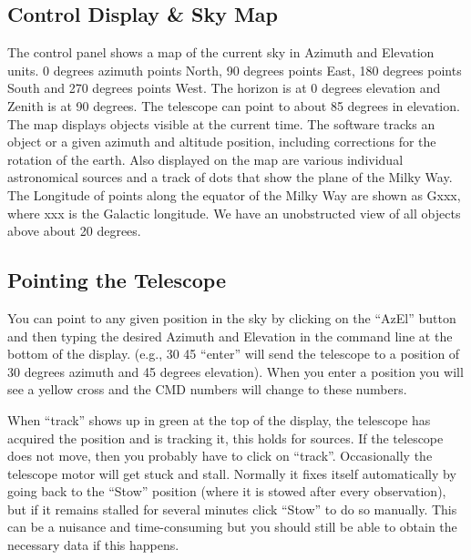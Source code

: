 \subsection{Control Display \& Sky Map}
The control panel shows a map of the current sky in Azimuth and
Elevation units. 0 degrees azimuth points North, 90 degrees points East, 180
degrees points South and 270 degrees points West. The horizon is at 0 degrees
elevation and Zenith is at 90 degrees. The telescope can point to about 85
degrees in elevation.
The map displays objects visible at the current time. The software tracks
an object or a given azimuth and altitude position, including corrections for the
rotation of the earth. Also displayed on the map are various individual
astronomical sources and a track of dots that show the plane of the Milky Way.
The Longitude of points along the equator of the Milky Way are shown as Gxxx,
where xxx is the Galactic longitude. We have an unobstructed view of all objects
above about 20 degrees.

\subsection{Pointing the Telescope}
You can point to any given position in the sky by clicking on the “AzEl”
button and then typing the desired Azimuth and Elevation in the command line at
the bottom of the display. (e.g., 30 45 “enter” will send the telescope to a position
of 30 degrees azimuth and 45 degrees elevation). When you enter a position you
will see a yellow cross and the CMD numbers will change to these numbers. 

When “track” shows up in green at the top of the display, the telescope has
acquired the position and is tracking it, this holds for sources. If the telescope
does not move, then you probably have to click on “track”.
Occasionally the telescope motor will get stuck and stall. Normally it fixes
itself automatically by going back to the “Stow” position (where it is stowed after
every observation), but if it remains stalled for several minutes click “Stow” to do
so manually. This can be a nuisance and time-consuming but you should still be
able to obtain the necessary data if this happens.

